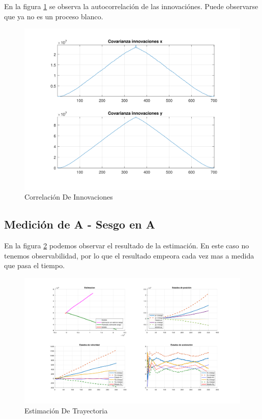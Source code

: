 	En la figura \ref{fig:ej4d_cov} se observa la autocorrelación de las innovaciónes. Puede observarse que ya no es un proceso blanco.
	
	\begin{figure}[H]
		\centering
		\includegraphics[width=1.0\textwidth,keepaspectratio]{Figuras/covinn_ej4d.pdf}
		\caption{Correlación De Innovaciones}
		\label{fig:ej4d_cov}
	\end{figure}


\subsection{Medición de A - Sesgo en A}

	En la figura \ref{fig:ej4e} podemos observar el resultado de la estimación. En este caso no tenemos observabilidad, por lo que el resultado empeora cada vez mas a medida que pasa el tiempo.

	\begin{figure}[H]
		\centering
		\includegraphics[width=1.0\textwidth,keepaspectratio]{Figuras/graf_ej4e.pdf}
		\caption{Estimación De Trayectoria}
		\label{fig:ej4e}
	\end{figure}
	
